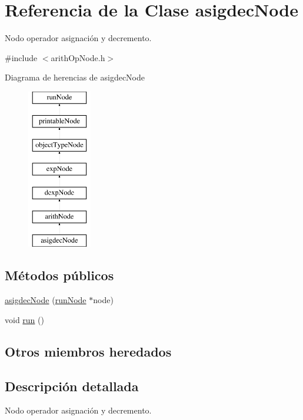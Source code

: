 \hypertarget{classasigdecNode}{\section{Referencia de la Clase asigdec\-Node}
\label{classasigdecNode}
}


Nodo operador asignación y decremento.  




{\ttfamily \#include $<$arith\-Op\-Node.\-h$>$}

Diagrama de herencias de asigdec\-Node\begin{figure}[H]
\begin{center}
\leavevmode
\includegraphics[height=7.000000cm]{classasigdecNode}
\end{center}
\end{figure}
\subsection*{Métodos públicos}
\begin{DoxyCompactItemize}
\item 
\hyperlink{classasigdecNode_ac3ec554aeeee40c2ecd063f856796af8}{asigdec\-Node} (\hyperlink{classrunNode}{run\-Node} $\ast$node)
\item 
void \hyperlink{classasigdecNode_a64dcc521a5b122854a4736943823e82c}{run} ()
\end{DoxyCompactItemize}
\subsection*{Otros miembros heredados}


\subsection{Descripción detallada}
Nodo operador asignación y decremento. 

